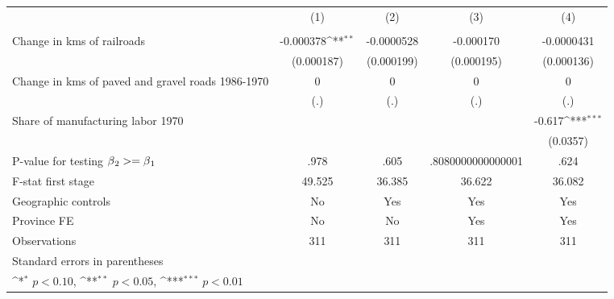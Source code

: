 {
\def\sym#1{\ifmmode^{#1}\else\(^{#1}\)\fi}
\begin{tabular}{l*{4}{c}}
\hline\hline
                &\multicolumn{1}{c}{(1)}&\multicolumn{1}{c}{(2)}&\multicolumn{1}{c}{(3)}&\multicolumn{1}{c}{(4)}\\
                &\multicolumn{1}{c}{}&\multicolumn{1}{c}{}&\multicolumn{1}{c}{}&\multicolumn{1}{c}{}\\
\hline
Change in kms of railroads&-0.000378\sym{**} &-0.0000528         &-0.000170         &-0.0000431         \\
                &(0.000187)         &(0.000199)         &(0.000195)         &(0.000136)         \\
[1em]
Change in kms of paved and gravel roads 1986-1970&        0         &        0         &        0         &        0         \\
                &      (.)         &      (.)         &      (.)         &      (.)         \\
[1em]
Share of manufacturing labor 1970&                  &                  &                  &   -0.617\sym{***}\\
                &                  &                  &                  & (0.0357)         \\
\hline
P-value for testing $\beta\\_2 >= \beta\\_1$&     .978         &     .605         &.8080000000000001         &     .624         \\
F-stat first stage&   49.525         &   36.385         &   36.622         &   36.082         \\
Geographic controls&       No         &      Yes         &      Yes         &      Yes         \\
Province FE     &       No         &       No         &      Yes         &      Yes         \\
Observations    &      311         &      311         &      311         &      311         \\
\hline\hline
\multicolumn{5}{l}{\footnotesize Standard errors in parentheses}\\
\multicolumn{5}{l}{\footnotesize \sym{*} \(p<0.10\), \sym{**} \(p<0.05\), \sym{***} \(p<0.01\)}\\
\end{tabular}
}
